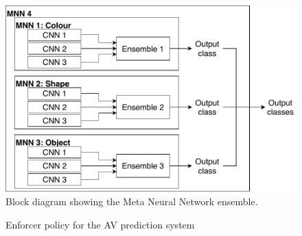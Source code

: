 \begin{figure}[h]
	\centering
	\includegraphics[scale=0.9]{Content/fig/MNN.pdf}
	\caption{Block diagram showing the Meta Neural Network ensemble. \label{fig:mnn}}
\end{figure}

\begin{figure}[t]
	\centering
	\scalebox{1}{}
	\caption{Enforcer policy for the AV prediction system \label{fig:signrte}}
\end{figure}